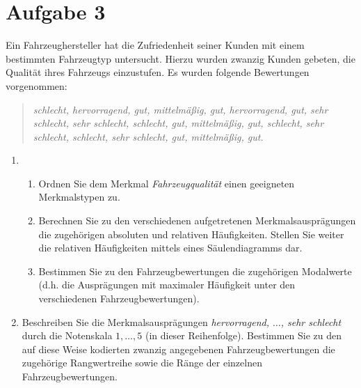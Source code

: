 \documentclass{exercise}
\begin{document}
    \section*{Aufgabe 3}

    \begin{problem}
        Ein Fahrzeughersteller hat die Zufriedenheit seiner Kunden mit einem bestimmten Fahrzeugtyp untersucht.
        Hierzu wurden zwanzig Kunden gebeten, die Qualität ihres Fahrzeugs einzustufen.
        Es wurden folgende Bewertungen vorgenommen:
        \begin{quote}
            \emph{schlecht, hervorragend, gut, mittelmäßig, gut, hervorragend, gut, sehr schlecht, sehr schlecht, schlecht, gut, mittelmäßig, gut, schlecht, sehr schlecht, schlecht, sehr schlecht, gut, mittelmäßig, gut.}
        \end{quote}
        \begin{enumerate}
            \item
            \begin{enumerate}
                \item Ordnen Sie dem Merkmal \emph{Fahrzeugqualität} einen geeigneten Merkmalstypen zu.
                \item Berechnen Sie zu den verschiedenen aufgetretenen Merkmalsausprägungen die zugehörigen absoluten und relativen Häufigkeiten.
                Stellen Sie weiter die relativen Häufigkeiten mittels eines Säulendiagramms dar.
                \item Bestimmen Sie zu den Fahrzeugbewertungen die zugehörigen Modalwerte (d.h. die Ausprägungen mit maximaler Häufigkeit unter den verschiedenen Fahrzeugbewertungen).
            \end{enumerate}
            \item Beschreiben Sie die Merkmalsausprägungen \emph{hervorragend, \(\ldots\), sehr schlecht} durch die Notenskala \(1, \ldots, 5\) (in dieser Reihenfolge).
            Bestimmen Sie zu den auf diese Weise kodierten zwanzig angegebenen Fahrzeugbewertungen die zugehörige Rangwertreihe sowie die Ränge der einzelnen Fahrzeugbewertungen.
        \end{enumerate}
    \end{problem}
\end{document}
